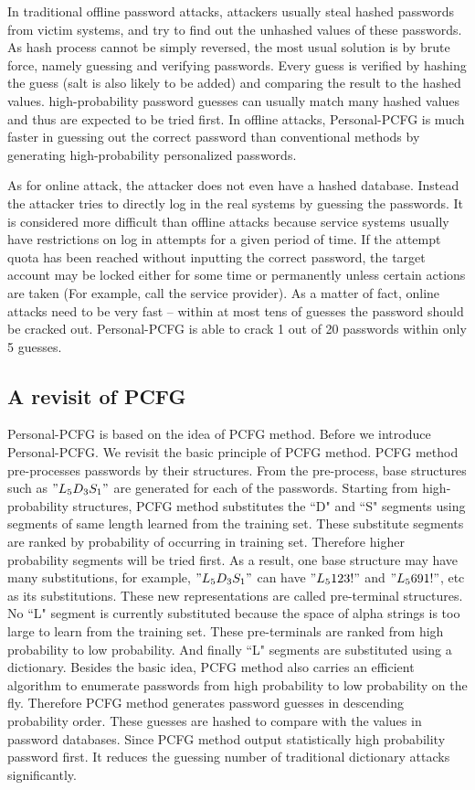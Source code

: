 In traditional offline password attacks, attackers usually steal hashed passwords from victim systems, and try to find out the unhashed values of these passwords. As hash process cannot be simply reversed, the most usual solution is by brute force, namely guessing and verifying passwords. Every guess is verified by hashing the guess (salt is also likely to be added) and comparing the result to the hashed values. high-probability password guesses can usually match many hashed values and thus are expected to be tried first. In offline attacks, Personal-PCFG is much faster in guessing out the correct password than conventional methods by generating high-probability personalized passwords.

As for online attack, the attacker does not even have a hashed database. Instead the attacker tries to directly log in the real systems by guessing the passwords. It is considered more difficult than offline attacks because service systems usually have restrictions on log in attempts for a given period of time. If the attempt quota has been reached without inputting the correct password, the target account may be locked either for some time or permanently unless certain actions are taken (For example, call the service provider). As a matter of fact, online attacks need to be very fast -- within at most tens of guesses the password should be cracked out. Personal-PCFG is able to crack 1 out of 20 passwords within only 5 guesses. 

\subsection{A revisit of PCFG}
Personal-PCFG is based on the idea of PCFG method. Before we introduce Personal-PCFG. We revisit the basic principle of PCFG method. PCFG method pre-processes passwords by their structures. From the pre-process, base structures such as $"L_5D_3S_1"$ are generated for each of the passwords. Starting from high-probability structures, PCFG method substitutes the ``D" and ``S" segments using segments of same length learned from the training set. These substitute segments are ranked by probability of occurring in training set. Therefore higher probability segments will be tried first. As a result, one base structure may have many substitutions, for example, $"L_5D_3S_1"$ can have $"L_5123!"$ and $"L_5691!"$, etc as its substitutions. These new representations are called pre-terminal structures. No ``L" segment is currently substituted because the space of alpha strings is too large to learn from the training set. These pre-terminals are ranked from high probability to low probability. And finally ``L" segments are substituted using a dictionary. Besides the basic idea, PCFG method also carries an efficient algorithm to enumerate passwords from high probability to low probability on the fly. Therefore PCFG method generates password guesses in descending probability order. These guesses are hashed to compare with the values in password databases. Since PCFG method output statistically high probability password first. It reduces the guessing number of traditional dictionary attacks significantly. 

